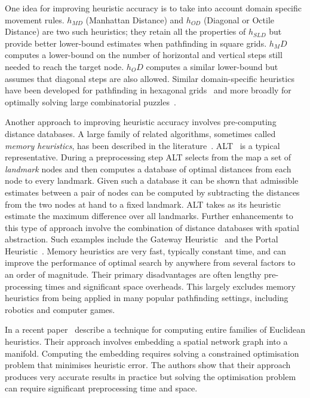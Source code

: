 One idea for improving heuristic accuracy is to take into account domain
specific movement rules.  $h_{MD}$ (Manhattan Distance) and $h_{OD}$ (Diagonal
or Octile Distance) are two such heuristics; they retain all the properties of
$h_{SLD}$ but provide better lower-bound estimates when pathfinding in square
grids. $h_MD$ computes a lower-bound on the number of horizontal and vertical
steps still needed to reach the target node. $h_OD$ computes a similar
lower-bound but assumes that diagonal steps are also allowed.  Similar
domain-specific heuristics have been developed for pathfinding in hexagonal
grids~\citep{yap02} and more broadly for optimally solving large combinatorial
puzzles~\citep{korf96}.

Another approach to improving heuristic accuracy involves pre-computing
distance databases.  A large family of related algorithms, sometimes called
\emph{memory heuristics}, has been described in the
literature~\citep{goldberg05,bjornsson06,sturtevant07,felner09,goldenberg10,anderson10}.
ALT~\citep{goldberg05} is a typical representative. During a preprocessing
step ALT selects from the map a set of \emph{landmark} nodes and then computes
a database of optimal distances from each node to every landmark. Given such a
database it can be shown that admissible estimates between a pair of nodes can
be computed by subtracting the distances from the two nodes at hand to a fixed
landmark.  ALT takes as its heuristic estimate the maximum difference over all
landmarks.  Further enhancements to this type of approach involve the
combination of distance databases with spatial abstraction. Such examples
include the Gateway Heuristic~\citep{bjornsson06} and the Portal
Heuristic~\citep{goldenberg10}. Memory heuristics are very fast, typically
constant time, and can improve the performance of optimal search by anywhere
from several factors to an order of magnitude. Their primary disadvantages are
often lengthy pre-processing times and significant space overheads.  This
largely excludes memory heuristics from being applied in many popular
pathfinding settings, including robotics and computer games.

In a recent paper~\cite{rayner11} describe a technique for computing entire
families of Euclidean heuristics. Their approach involves
embedding a spatial network graph into a manifold. Computing the embedding
requires solving a constrained optimisation problem that minimises heuristic
error. The authors show that their approach produces very accurate results in
practice but solving the optimisation problem can require significant
preprocessing time and space.  

